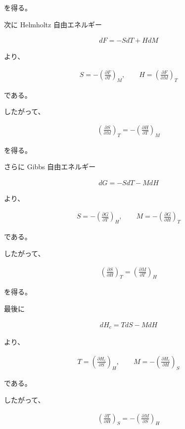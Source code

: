\documentclass[platex,dvipdfmx,a4paper]{jsarticle}
\begin{document}
を得る。

次に Helmholtz 自由エネルギー

\begin{align*}
dF
=
-SdT+HdM
\end{align*}

より、

\begin{align*}
S
=
-\left(
\frac{\partial F}{\partial T}
\right)_M,
\qquad
H
=
\left(
\frac{\partial F}{\partial M}
\right)_T
\end{align*}

である。

したがって、

\begin{align*}
\left(
\frac{\partial S}{\partial M}
\right)_T
=
-
\left(
\frac{\partial H}{\partial T}
\right)_M
\end{align*}

を得る。

さらに Gibbs 自由エネルギー

\begin{align*}
dG
=
-SdT-MdH
\end{align*}

より、

\begin{align*}
S
=
-\left(
\frac{\partial G}{\partial T}
\right)_H,
\qquad
M
=
-\left(
\frac{\partial G}{\partial H}
\right)_T
\end{align*}

である。

したがって、

\begin{align*}
\left(
\frac{\partial S}{\partial H}
\right)_T
=
\left(
\frac{\partial M}{\partial T}
\right)_H
\end{align*}

を得る。

最後に

\begin{align*}
dH_c
=
TdS-MdH
\end{align*}

より、

\begin{align*}
T
=
\left(
\frac{\partial H_c}{\partial S}
\right)_H,
\qquad
M
=
-\left(
\frac{\partial H_c}{\partial H}
\right)_S
\end{align*}

である。

したがって、

\begin{align*}
\left(
\frac{\partial T}{\partial H}
\right)_S
=
-
\left(
\frac{\partial M}{\partial S}
\right)_H
\end{align*}
\end{document}
